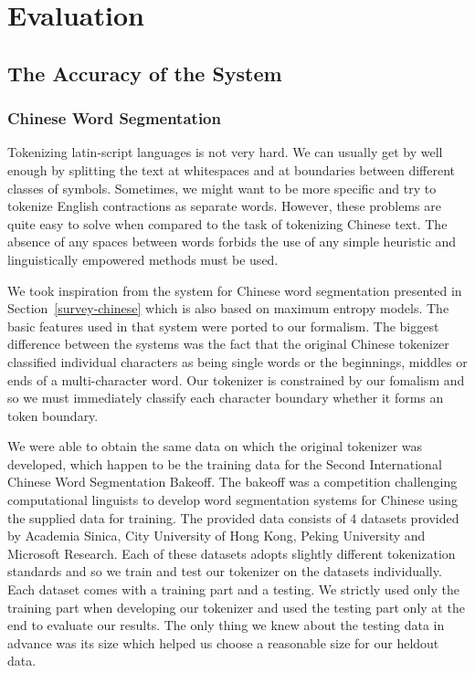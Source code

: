 \chapter{Evaluation}
\label{chap:eval}



\section{The Accuracy of the System}
\label{sec:eval-acc}

\subsection{Chinese Word Segmentation}
\label{ssec:eval-acc-chinese}

Tokenizing latin-script languages is not very hard. We can usually get by well
enough by splitting the text at whitespaces and at boundaries between different
classes of symbols. Sometimes, we might want to be more specific and try to
tokenize English contractions as separate words. However, these problems are
quite easy to solve when compared to the task of tokenizing Chinese text. The
absence of any spaces between words forbids the use of any simple heuristic and
linguistically empowered methods must be used.

We took inspiration from the system for Chinese word segmentation presented in
Section~\ref{survey-chinese} which is also based on maximum entropy models. The
basic features used in that system were ported to our formalism. The biggest
difference between the systems was the fact that the original Chinese tokenizer
classified individual characters as being single words or the beginnings,
middles or ends of a multi-character word. Our tokenizer is constrained by our
fomalism and so we must immediately classify each character boundary whether it
forms an token boundary.

We were able to obtain the same data on which the original tokenizer was
developed, which happen to be the training data for the Second International
Chinese Word Segmentation Bakeoff. The bakeoff was a competition challenging
computational linguists to develop word segmentation systems for Chinese using
the supplied data for training. The provided data consists of 4 datasets
provided by Academia Sinica, City University of Hong Kong, Peking University
and Microsoft Research. Each of these datasets adopts slightly different
tokenization standards and so we train and test our tokenizer on the datasets
individually. Each dataset comes with a training part and a testing. We
strictly used only the training part when developing our tokenizer and used the
testing part only at the end to evaluate our results. The only thing we knew
about the testing data in advance was its size which helped us choose a
reasonable size for our heldout data.

